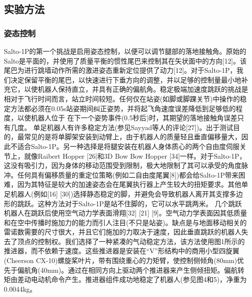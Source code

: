 \begin{translation}
\subsection{实验方法}
\subsubsection{姿态控制}
Salto-1P的第一个挑战是启用姿态控制，以便可以调节腿部的落地接触角。原始的Salto是平面的，并使用了质量平衡的惯性尾巴来控制其在矢状面中的方向[12]。该尾巴为进行跳墙动作所需的激进姿态重新定位提供了动力[12]。对于Salto-1P，我们决定保留平衡的尾巴，以快速进行下垂方向的调整，并以足够的控制量最小地补充它，以使机器人保持直立，并具有正确的偏航角。稳定极端加速度跳跃的挑战是相对于飞行时间而言，站立时间较短。任何仅在站姿(如脚或脚踝关节)中操作的稳定方法都必须在0.05s站姿期间纠正姿势，并将起飞角速度误差降低到足够低的程度，以使机器人位于
在下一个姿势事件(0.5秒后)时，其期望的落地接触角误差只有几度。
单足机器人有许多稳定方法(参见Sayyad等人的评论[27])。出于测试目的，最常见的是将单脚架安装到动臂上，由于机器人的质量轻且垂直偏移量大，因此不适合Salto-1P。另一种选择是将腿安装在机器人身体质心的两个自由度伺服关节上，就像Raibert Hopper [26]和3D Bow Bow Hopper [34]一样。对于Salto-1P，这没有吸引力，因为身体的移动范围受到限制，极大地限制了其可以承受的角度脉冲。任何具有偏移质量的重定位策略(例如二自由度尾翼[8])都会给Salto-1P带来困难，因为其特征是较大的加速姿态会在尾翼执行器上产生较大的扭矩要求。其他单足机器人(例如[16] [30])选择静态稳定的脚，并避免会导致机器人离开其支撑多边形的跳跃。这种方法对于Salto-1P是站不住脚的，它可以水平跳两米。
几个跳跃机器人在跳跃后使用空气动力学表面滑翔[32] [21] [9]。空气动力学表面因其低质量和在空中传播时施加力的能力而引人注目(不只是站姿)。缺点是与地面移动相关的雷诺数需要的尺寸很大，并且它们施加的力取决于速度，因此垂直跳跃的机器人失去了顶点的控制权。我们选择了一种紧凑的气动稳定方法，该方法使用图1所示的推进器，而不依赖于速度。这些推进器是安装在“V”形结构中的商用小型四旋翼(Cheerson CX-10)螺旋桨叶片，带有围绕重心的力矩臂，使控制侧倾角(80mm)优先于偏航角(40mm)。通过在相同方向上驱动两个推进器来产生侧倾扭矩。偏航转矩由差动电动机命令产生。推进器组件成功地稳定了机器人(参见图4和5)，净重为0.0044kg。

\end{translation}
